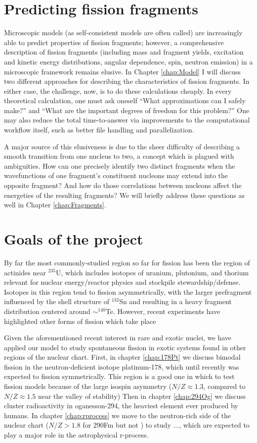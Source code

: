\section{Predicting fission fragments}
Microscopic models (as self-consistent models are often called) are increasingly able to predict properties of fission fragments; however, a comprehensive description of fission fragments (including mass and fragment yields, excitation and kinetic energy distributions, angular dependence, spin, neutron emission) in a microscopic framework remains elusive. In Chapter \ref{chap:Model} I will discuss two different approaches for describing the characteristics of fission fragments. In either case, the challenge, now, is to do these calculations cheaply. In every theoretical calculation, one must ask oneself ``What approximations can I safely make?'' and ``What are the important degrees of freedom for this problem?'' One may also reduce the total time-to-answer via improvements to the computational workflow itself, such as better file handling and parallelization.

A major source of this elusiveness is due to the sheer difficulty of describing a smooth transition from one nucleus to two, a concept which is plagued with ambiguities. How can one precisely identify two distinct fragments when the wavefunctions of one fragment’s constituent nucleons may extend into the opposite fragment? And how do those correlations between nucleons affect the energeties of the resulting fragments? We will briefly address these questions as well in Chapter \ref{chap:Fragments}.


\section{Goals of the project}
By far the most commonly-studied region so far for fission has been the region of actinides near $^{235}$U, which includes isotopes of uranium, plutonium, and thorium relevant for nuclear energy/reactor physics and stockpile stewardship/defense. Isotopes in this region tend to fission asymmetrically, with the larger prefragment influenced by the shell structure of $^{132}$Sn and resulting in a heavy fragment distribution centered around $\sim^{140}$Te. However, recent experiments have highlighted other forms of fission which take place

Given the aforementioned recent interest in rare and exotic nuclei, we have applied our model to study spontaneous fission in exotic systems found in other regions of the nuclear chart. First, in chapter \ref{chap:178Pt} we discuss bimodal fission in the neutron-deficient isotope platinum-178, which until recently was expected to fission symmetrically. This region is a good one in which to test fission models because of the large isospin asymmetry ($N/Z\approx1.3$, compared to $N/Z\approx1.5$ near the valley of stability) Then in chapter \ref{chap:294Og} we discuss cluster radioactivity in oganesson-294, the heaviest element ever produced by humans. In chapter \ref{chap:rprocess} we move to the neutron-rich side of the nuclear chart ($N/Z>1.8$ for 290Fm but not {\Cf}) to study ..., which are expected to play a major role in the astrophysical r-process.

